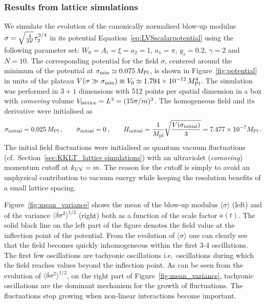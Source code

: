 \documentclass[12pt]{article}
\newcommand{\be}{\begin{equation}}
\newcommand{\ee}{\end{equation}}
\begin{document}
\subsubsection{Results from lattice simulations}
\label{sec:latticesimulations}
We simulate the evolution of the canonically normalised blow-up modulus $\sigma=\sqrt{\frac{4}{3{\cal V}}}\tau_2^{3/4}$ in its potential Equation~\eqref{eq:LVSscalarpotential} using the following parameter set: $W_0=A_i=\xi=a_2=1$, $a_1=\pi$, $g_s=0.2$, $\gamma=2$ and $N=10$. The corresponding potential for the field $\sigma$, centered around the minimum of the potential at $\sigma_{\rm min}\simeq0.075\,M_{\rm Pl}$, is shown in Figure~\ref{fig:potential} in units of the plateau $V(\sigma \gg \sigma_{\rm min})\equiv V_0 \simeq 1.794\times10^{-12}\,M^4_{\rm Pl}$. The simulation was performed in $3+1$ dimensions with 512 points per spatial dimension in a box with \textit{comoving} volume $V_{\rm lattice}=L^3=(15\pi/m)^3$. The homogeneous field and its derivative were initialised as
\be
\sigma_{\rm initial} = 0.025\,M_{\rm Pl}\,,\qquad \dot{\sigma}_{\rm initial} = 0\,,\qquad H_{\rm initial} = \frac{1}{M_{\rm pl}}\sqrt{\frac{V(\sigma_{\rm initial})}{3}} = 7.477\times10^{-7} M_{\rm Pl}\,.
\ee
The initial field fluctuations were initialised as quantum vacuum fluctuations (cf.\ Section~\ref{sec:KKLT_lattice simulations}) with an ultraviolet (\textit{comoving}) momentum cutoff at $k_{\rm UV} = m$. The reason for the cutoff is simply to avoid an unphysical contribution to vacuum energy while keeping the resolution benefits of a small lattice spacing.


Figure~\ref{fig:mean_variance} shows the mean of the blow-up modulus $\langle\sigma\rangle$ (left) and of the variance $\langle\delta\sigma^2\rangle^{1/2}$ (right) both as a function of the scale factor $a(t)$. The solid black line on the left part of the figure denotes the field value at the inflection point of the potential. From the evolution of $\langle\sigma\rangle$ one can clearly see that the field becomes quickly inhomogeneous within the first 3-4 oscillations. The first few oscillations are tachyonic oscillations i.e.\ oscillations during which the field reaches values beyond the inflection point. As can be seen from the evolution of $\langle\delta\sigma^2\rangle^{1/2}$, on the right part of Figure~\ref{fig:mean_variance}, tachyonic oscillations are the dominant mechanism for the growth of fluctuations. The fluctuations stop growing when non-linear interactions become important.
\end{document}
